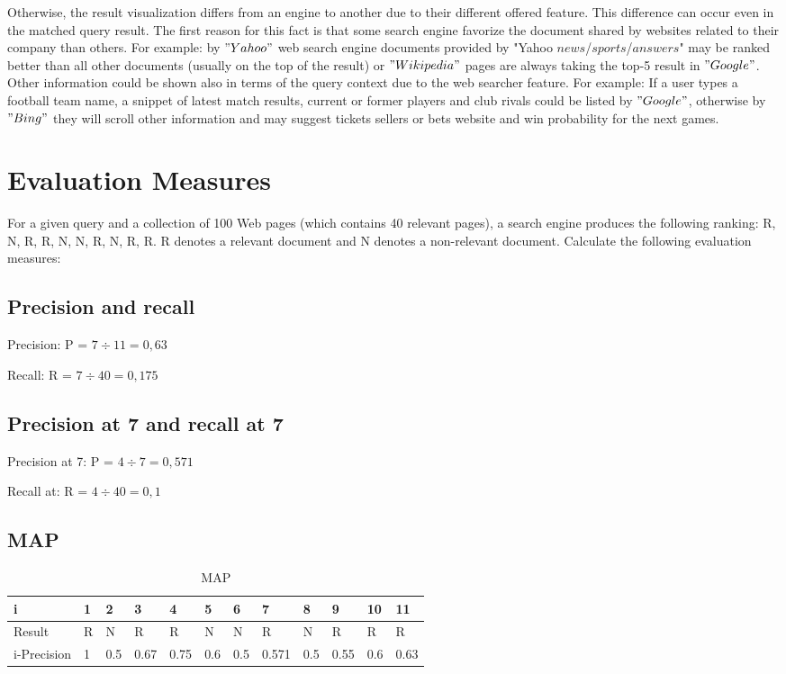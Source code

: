 \documentclass{scrartcl}
\begin{document}
Otherwise, the result visualization differs from an engine to another due to their different offered feature. This difference can occur even in the matched query result. The first reason for this fact is that some search engine favorize the document shared by websites related to their company than others. For example: by $"Yahoo"$ web search engine documents provided by "Yahoo $news$/$sports$/$answers$" may be ranked better than all other documents (usually on the top of the result) or $"Wikipedia"$ pages are always taking the top-5 result in $"Google"$. Other information could be shown also in terms of the query context due to the web searcher feature. For example: If a user types a football team name, a snippet of latest match results, current or former players and club rivals could be listed by $"Google"$, otherwise by $"Bing"$ they will scroll other information and may suggest tickets sellers or bets website and win probability for the next games. 


\section{Evaluation Measures}

For a given query and a collection of 100 Web pages (which contains 40 relevant pages), a search
engine produces the following ranking: R, N, R, R, N, N, R, N, R, R. R denotes a relevant document
and N denotes a non-relevant document. Calculate the following evaluation measures:


\subsection{Precision and recall  }

Precision: P = $ 7 \div 11 = 0,63$

Recall: R = $ 7 \div 40 = 0,175$

\subsection{Precision at 7 and recall at 7  }

Precision at 7: P = $ 4 \div 7 = 0,571$

Recall at: R = $ 4 \div 40 = 0,1$

\subsection{MAP}

\begin{table}[h]
\centering
\caption{MAP}
\begin{tabular}{|l|l|l|l|l|l|l|l|l|l|l|l|}
\hline
i           & 1 & 2   & 3    & 4    & 5   & 6   & 7     & 8   & 9    & 10  & 11   \\ \hline
Result      & R & N   & R    & R    & N   & N   & R     & N   & R    & R   & R    \\ \hline
i-Precision & 1 & 0.5 & 0.67 & 0.75 & 0.6 & 0.5 & 0.571 & 0.5 & 0.55 & 0.6 & 0.63 \\ \hline
\end{tabular}
\end{table}
\end{document}
